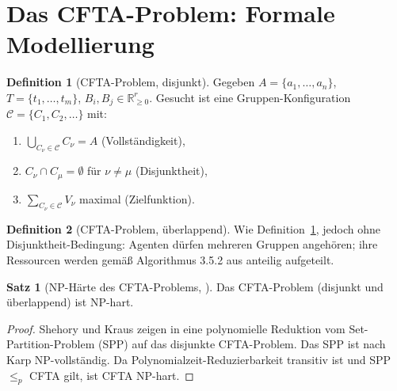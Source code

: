 ﻿\documentclass[a4paper,12pt]{article}
\theoremstyle{definition}
\newtheorem{definition}{Definition}
\newtheorem{satz}{Satz}
\begin{document}
\section{Das CFTA-Problem: Formale Modellierung}

\begin{definition}[CFTA-Problem, disjunkt]
    \label{def:cfta_disj}
    Gegeben $A = \{a_1, \ldots, a_n\}$, $T = \{t_1, \ldots, t_m\}$,
    $B_i, B_j \in \mathbb{R}_{\geq 0}^r$.
    Gesucht ist eine Gruppen-Konfiguration
    $\mathcal{C} = \{C_1, C_2, \ldots\}$ mit:
    \begin{enumerate}
        \item $\bigcup_{C_\nu \in \mathcal{C}} C_\nu = A$ (Vollst\"{a}ndigkeit),
        \item $C_\nu \cap C_\mu = \emptyset$ f\"{u}r $\nu \neq \mu$ (Disjunktheit),
        \item $\sum_{C_\nu \in \mathcal{C}} V_\nu$ maximal (Zielfunktion).
    \end{enumerate}
\end{definition}

\begin{definition}[CFTA-Problem, \"{u}berlappend]
    \label{def:cfta_overlap}
    Wie Definition~\ref{def:cfta_disj}, jedoch ohne Disjunktheit-Bedingung:
    Agenten d\"{u}rfen mehreren Gruppen angeh\"{o}ren; ihre Ressourcen werden
    gem\"{a}{\ss} Algorithmus 3.5.2 aus \cite{sk98} anteilig aufgeteilt.
\end{definition}

\begin{satz}[NP-H\"{a}rte des CFTA-Problems, \cite{sk95}]
    Das CFTA-Problem (disjunkt und \"{u}berlappend) ist NP-hart.
\end{satz}

\begin{proof}
    Shehory und Kraus zeigen in \cite{sk95} eine polynomielle Reduktion
    vom Set-Partition-Problem (SPP) auf das disjunkte CFTA-Problem.
    Das SPP ist nach Karp \cite{karp72} NP-vollst\"{a}ndig.
    Da Polynomialzeit-Reduzierbarkeit transitiv ist und SPP $\leq_p$ CFTA gilt,
    ist CFTA NP-hart. \qedhere
\end{proof}
\end{document}
